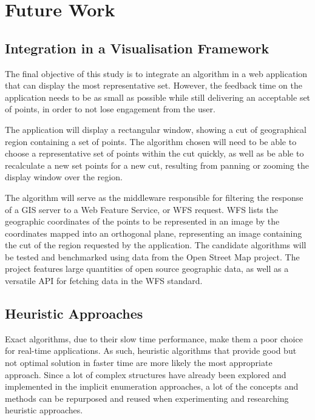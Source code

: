 \chapter{Future Work}
\label{chap:future}
\section{Integration in a Visualisation Framework}

The final objective of this study is to integrate an algorithm in a web application that can display the most representative set. However, the feedback time on the application needs to be as small as possible while still delivering an acceptable set of points, in order to not lose engagement from the user.

The application will display a rectangular window, showing a cut of geographical region containing a set of points. The algorithm chosen will need to be able to choose a representative set of points within the cut quickly, as well as be able to recalculate a new set points for a new cut, resulting from panning or zooming the display window over the region.

The algorithm will serve as the middleware responsible for filtering the response of a GIS server to a Web Feature Service, or WFS request. WFS lists the geographic coordinates of the points to be represented in an image by the coordinates mapped into an orthogonal plane, representing an image containing the cut of the region requested by the application.
The candidate algorithms will be tested and benchmarked using data from the Open Street Map project. The project features large quantities of open source geographic data, as well as a versatile API for fetching data in the WFS standard.
\section{Heuristic Approaches}

Exact algorithms, due to their slow time performance, make them a poor choice for real-time applications. As such, heuristic algorithms that provide good but not optimal solution in faster time are more likely the most appropriate approach.
Since a lot of complex structures have already been explored and implemented in the implicit enumeration approaches, a lot of the concepts and methods can be repurposed and reused when experimenting and researching heuristic approaches. 


